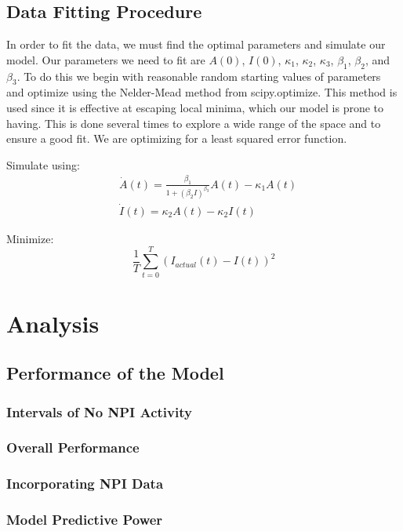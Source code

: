 \documentclass[letterpaper, 10 pt, conference]{ieeeconf}  %
\begin{document}
\subsection{Data Fitting Procedure}

In order to fit the data, we must find the optimal parameters and simulate our model. Our parameters we need to fit are $A(0)$, $I(0)$, $\kappa_1$, $\kappa_2$, $\kappa_3$, $\beta_1$, $\beta_2$, and $\beta_3$. To do this we begin with reasonable random starting values of parameters and optimize using the Nelder-Mead method from scipy.optimize. This method is used since it is effective at escaping local minima, which our model is prone to having. This is done several times to explore a wide range of the space and to ensure a good fit. We are optimizing for a least squared error function.

Simulate using:
\begin{equation*} 
\begin{split}
&\dot{A}(t) = {\frac{\beta_1}{1+(\beta_2 I)^{\beta_3}}}A(t) - \kappa_1 A(t) \\
& \dot{I}(t) = \kappa_2 A(t) - \kappa_2 I(t)
\end{split}
\end{equation*}

Minimize:
\begin{equation*}
\frac{1}{T} \sum_{t=0}^{T}(I_{actual}(t) - I(t))^2
\end{equation*}

\section{Analysis}

\subsection{Performance of the Model}

\subsubsection{Intervals of No NPI Activity}
\subsubsection{Overall Performance}
\subsubsection{Incorporating NPI Data}
\subsubsection{Model Predictive Power}
\end{document}
